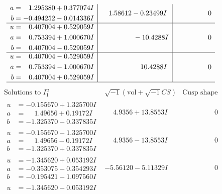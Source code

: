 \documentclass[1p]{elsarticle_modified}
\theoremstyle{definition}
\newcommand{\I}{\sqrt{-1}}
\begin{document}
$$\begin{array}{c|c|c}
\begin{aligned}
a &= \phantom{-}1.295380 + 0.377074 I \\
b &= -0.494252 - 0.014336 I\end{aligned}
 & \phantom{-}1.58612 - 0.23499 I & \phantom{-0.000000 } 0 \\ \hline\begin{aligned}
u &= \phantom{-}0.407004 + 0.529059 I \\
a &= \phantom{-}0.753394 + 1.000670 I \\
b &= \phantom{-}0.407004 - 0.529059 I\end{aligned}
 & \phantom{-0.000000 } -10.4288 I & \phantom{-0.000000 } 0 \\ \hline\begin{aligned}
u &= \phantom{-}0.407004 - 0.529059 I \\
a &= \phantom{-}0.753394 - 1.000670 I \\
b &= \phantom{-}0.407004 + 0.529059 I\end{aligned}
 & \phantom{-0.000000 -}10.4288 I & \phantom{-0.000000 } 0\\
 \hline 
 \end{array}$$\newpage$$\begin{array}{c|c|c}  
\text{Solutions to }I^u_{1}& \I (\text{vol} + \sqrt{-1}CS) & \text{Cusp shape}\\
 \hline 
\begin{aligned}
u &= -0.155670 + 1.325700 I \\
a &= \phantom{-}1.49656 + 0.19172 I \\
b &= -1.325370 - 0.337835 I\end{aligned}
 & \phantom{-}4.9356 + 13.8553 I & \phantom{-0.000000 } 0 \\ \hline\begin{aligned}
u &= -0.155670 - 1.325700 I \\
a &= \phantom{-}1.49656 - 0.19172 I \\
b &= -1.325370 + 0.337835 I\end{aligned}
 & \phantom{-}4.9356 - 13.8553 I & \phantom{-0.000000 } 0 \\ \hline\begin{aligned}
u &= -1.345620 + 0.053192 I \\
a &= -0.353075 - 0.354293 I \\
b &= -0.195421 - 1.097560 I\end{aligned}
 & -5.56120 - 5.11329 I & \phantom{-0.000000 } 0 \\ \hline\begin{aligned}
u &= -1.345620 - 0.053192 I \\

\end{aligned}
\end{array}$$
\end{document}
